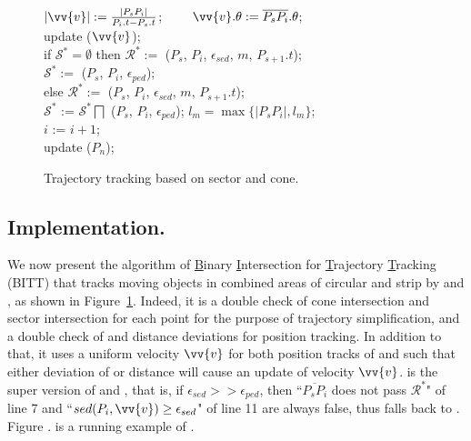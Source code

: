 \begin{figure}[tb!]
\begin{center}
{\begin{minipage}{3.3in}
{					\icc \>\hspace{7ex}    $|\vv{v}|:=\frac{|P_sP_{i}|}{P_{i}.t-P_s.t}$; ~~~~$\vv{v}.\theta:=\overline{P_sP_{i}}.\theta$; \\
					\icc \>\hspace{7ex}    update ($\vv{v}$); \\
					\icc \>\hspace{3ex} if $\mathcal{S}^*=\emptyset$ then $\mathcal{R}^*:=$ ($P_s$, $P_{i}$, $\epsilon_{sed}$, $m$, $P_{s+1}.t$); \\
					\icc \>\hspace{7ex}    $\mathcal{S}^*:=$ ($P_s$, $P_{i}$, $\epsilon_{ped}$); \\
					\icc \>\hspace{3ex} else $\mathcal{R}^*:=$ ($P_s$, $P_{i}$, $\epsilon_{sed}$, $m$, $P_{s+1}.t$); \\
					\icc \>\hspace{7ex}    $\mathcal{S}^*$ := $\mathcal{S}^*\bigsqcap$ ($P_s$, $P_{i}$, $\epsilon_{ped}$); $l_{m} = \max\{|P_sP_{i}|, l_{m}\}$;\\
					\icc \>\hspace{3ex} $i$ := $i +1$;\\
					\icc \>\hspace{0ex} update ($P_{n}$); 
				}
				\vspace{-2ex}
				\myhrule
			\end{minipage}
		}
	\end{center}
	\vspace{-1ex}
	\caption{\small Trajectory tracking based on sector and cone.}
	\label{alg:bitt}
	\vspace{-1ex}
\end{figure}

\subsection{Implementation.}
We now present the algorithm of \underline{B}inary \underline{I}ntersection for \underline{T}rajectory \underline{T}racking (BITT) that tracks moving objects in combined areas of circular and strip by \sed and \ped, as shown in Figure~\ref{alg:bitt}. 
%
Indeed, it is a double check of cone intersection and sector intersection for each point for the purpose of trajectory simplification, and a double check of \sed and \ped distance deviations for position tracking. In addition to that, it uses a uniform velocity $\vv{v}$ for both position tracks of \sed and \ped such that either deviation of \ped or \sed distance will cause an update of velocity $\vv{v}$. 
%
\bitt is the super version of \citt and \sitt, that is, if $\epsilon_{sed} >> \epsilon_{ped}$, then ``$\overline{P_sP_{i}}$ does not pass $\mathcal{R}^*$" of line 7 and ``$sed(P_i, \vv{v}) \ge \epsilon_{sed}$" of line 11 are always false, thus \bitt falls back to \sitt. 
Figure {\todo.} is a running example of \bitt. 




